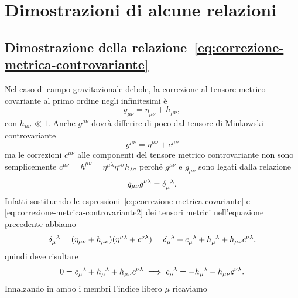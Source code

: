 \cleardoublepage
\chapter{Dimostrazioni di alcune relazioni}
\label{cha:dimostrazioni}

\section{Dimostrazione della
  relazione~\texorpdfstring{\eqref{eq:correzione-metrica-controvariante}}
  {(2.32)}}
\label{sec:dimostr-correz-metrica-controvariante}

Nel caso di campo gravitazionale debole, la correzione al tensore metrico
covariante al primo ordine negli infinitesimi è
\begin{equation}
  \label{eq:correzione-metrica-covariante}
  g_{\mu\nu} = \eta_{\mu\nu} + h_{\mu\nu},
\end{equation}
con $h_{\mu\nu} \ll 1$.  Anche $g^{\mu\nu}$ dovrà differire di poco dal tensore
di Minkowski controvariante
\begin{equation}
    \label{eq:correzione-metrica-controvariante2}
  g^{\mu\nu} = \eta^{\mu\nu} + c^{\mu\nu}
\end{equation}
ma le correzioni $c^{\mu\nu}$ alle componenti del tensore metrico controvariante
non sono semplicemente
$c^{\mu\nu} = h^{\mu\nu} = \eta^{\mu\lambda}\eta^{\nu\sigma} h_{\lambda\sigma}$
perché $g^{\mu\nu}$ e $g_{\mu\nu}$ sono legati dalla relazione
\begin{equation}
  g_{\mu\nu}g^{\nu\lambda} = \tensor{\delta}{_{\mu}^{\lambda}}.
\end{equation}
Infatti sostituendo le espressioni~\eqref{eq:correzione-metrica-covariante} e
\eqref{eq:correzione-metrica-controvariante2} dei tensori metrici nell'equazione
precedente abbiamo
\begin{equation}
  \tensor{\delta}{_{\mu}^{\lambda}} = (\eta_{\mu\nu} +
  h_{\mu\nu})(\eta^{\nu\lambda} + c^{\nu\lambda}) =
  \tensor{\delta}{_{\mu}^{\lambda}} + \tensor{c}{_{\mu}^{\lambda}} +
  \tensor{h}{_{\mu}^{\lambda}} + h_{\mu\nu}c^{\nu\lambda},
\end{equation}
quindi deve risultare
\begin{equation}
  0 = \tensor{c}{_{\mu}^{\lambda}} + \tensor{h}{_{\mu}^{\lambda}} +
  h_{\mu\nu}c^{\nu\lambda} \implies \tensor{c}{_{\mu}^{\lambda}} =
  -\tensor{h}{_{\mu}^{\lambda}} - h_{\mu\nu}c^{\nu\lambda}.
\end{equation}
Innalzando in ambo i membri l'indice libero $\mu$ ricaviamo
